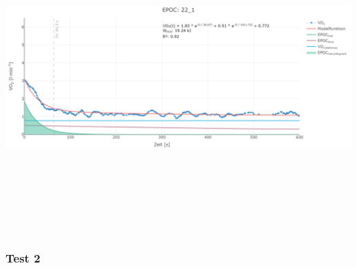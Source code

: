 \documentclass[
  letterpaper,
  DIV=11]{scrartcl}
\begin{document}
\includegraphics[width=11.45833in,height=4.6875in]{images/22_1.png}

\subsubsection{Test 2}
\end{document}
